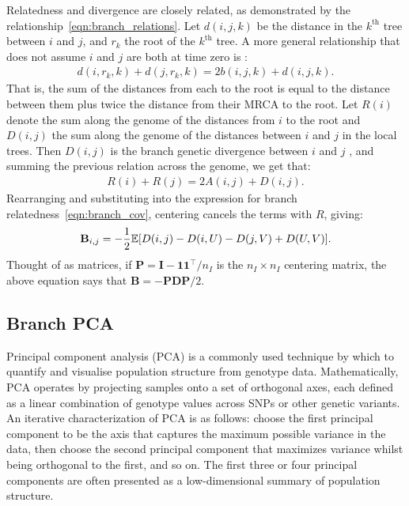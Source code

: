 Relatedness and divergence are closely related,
as demonstrated by the relationship~\eqref{eqn:branch_relations}.
%
Let $d(i,j,k)$ be the distance in the $k^\text{th}$ tree between $i$ and $j$,
and $r_k$ the root of the $k^\text{th}$ tree.
%
A more general relationship that does not assume $i$ and $j$ are both at time zero is
\citep{semple2003phylogenetics}:
%
\begin{align}
    d(i,r_k,k) + d(j,r_k,k) = 2 b(i,j,k) + d(i,j,k) .
\end{align}
%
That is, the sum of the distances from each to the root is
equal to the distance between them plus twice the distance from their MRCA to the root.
%
Let $R(i)$ denote the sum along the genome of the distances from $i$ to the root and
$D(i,j)$ the sum along the genome of the distances between $i$ and $j$ in the local trees.
%
Then $D(i,j)$ is the branch genetic divergence between $i$ and $j$ \citep{ralph2020efficiently},
and summing the previous relation across the genome, we get that:
%
\begin{align} \label{eqn:divergence_relatedness}
    R(i) + R(j) = 2 A(i,j) + D(i,j) .
\end{align}
%
Rearranging and substituting into the expression for branch relatedness~\eqref{eqn:branch_cov},
centering cancels the terms with $R$, giving:
%
\begin{align}\label{eqn:divergence_relatedness_branch}
    \mathbf{B}_{i,j} = - \frac{1}{2} \mathbb{E}[D(i,j) - D(i,U) - D(j,V) + D(U,V)] .
\end{align}
%
Thought of as matrices, if $\mathbf{P}=\mathbf{I} - \mathbf{1}\mathbf{1}^\intercal / n_I$ is the $n_I \times n_I$
centering matrix, the above equation says that $\mathbf{B} = - \mathbf{P} \mathbf{D} \mathbf{P} / 2$.

\subsection{Branch PCA}

Principal component analysis (PCA) is a commonly used technique by which to quantify and visualise population structure from genotype data. Mathematically, PCA operates by projecting samples onto a set of orthogonal axes, each defined as a linear combination of genotype values across SNPs or other genetic variants. An iterative characterization of PCA is as follows: choose the first principal component to be the axis that captures the maximum possible variance in the data, then choose the second principal component that maximizes variance whilst being orthogonal to the first, and so on. The first three or four principal components are often presented as a low-dimensional summary of population structure.

